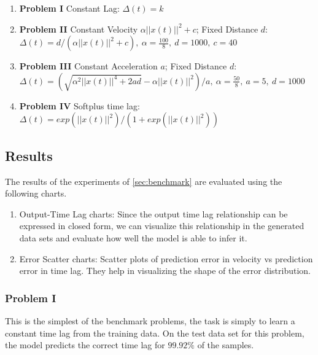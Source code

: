 \documentclass[envcountsect,runningheads]{llncs}
\theoremstyle{etoile}
\begin{document}
\begin{enumerate}
\item \textbf{Problem I} Constant Lag: \newline 
$\Delta(t) = k$

\item \textbf{Problem II} Constant Velocity $\alpha ||x(t)||^2 + c$; Fixed Distance $d$: 
\newline $\Delta(t) = d/(\alpha ||x(t)||^2 + c),\ \alpha = \frac{100}{8},\ d = 1000,\ c = 40$

\item \textbf{Problem III} Constant Acceleration $a$; Fixed Distance $d$: 
\newline $\Delta(t) = (\sqrt{\alpha^2||x(t)||^4 + 2ad} - \alpha||x(t)||^2)/a,\ \alpha = \frac{50}{8},\ a = 5,\ d = 1000$

\item \textbf{Problem IV} Softplus time lag: 
\newline $\Delta(t) = exp\left(||x(t)||^2\right)/\left(1 + exp(||x(t)||^2)\right)$

\end{enumerate}



\subsection{Results}

The results of the experiments of \ref{sec:benchmark} are evaluated using the following charts.

\begin{enumerate}
    \item Output-Time Lag charts: Since the output time lag relationship can be expressed in closed 
          form, we can visualize this relationship in the generated data sets and evaluate how well 
          the model is able to infer it.
    \item Error Scatter charts: Scatter plots of prediction error in velocity vs prediction error 
          in time lag. They help in visualizing the shape of the error distribution.
\end{enumerate}


\subsubsection{Problem I}

This is the simplest of the benchmark problems, the task is simply to learn a constant time lag from 
the training data. On the test data set for this problem, the model predicts the correct time lag for 
$99.92\%$ of the samples. 
\end{document}
